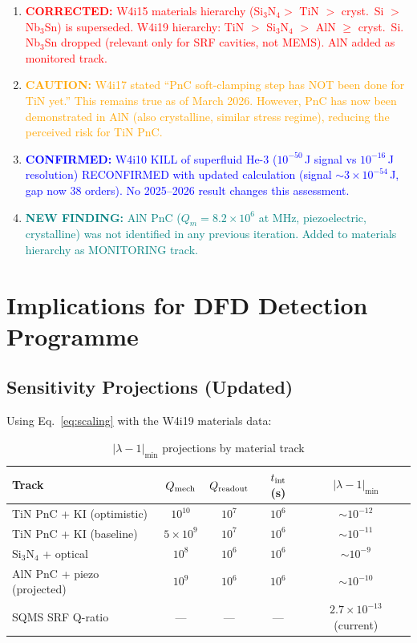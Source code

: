 \documentclass[11pt]{article}
\theoremstyle{remark}
\newcommand{\ee}[1]{\times 10^{#1}}
\newcommand{\confirmed}[1]{\textcolor{blue}{\textbf{CONFIRMED:} #1}}
\newcommand{\corrected}[1]{\textcolor{red}{\textbf{CORRECTED:} #1}}
\newcommand{\caution}[1]{\textcolor{orange}{\textbf{CAUTION:} #1}}
\newcommand{\newfinding}[1]{\textcolor{teal}{\textbf{NEW FINDING:} #1}}
\begin{document}
\begin{enumerate}
  \item \corrected{W4i15 materials hierarchy (Si$_3$N$_4 > $ TiN $>$
    cryst.\ Si $>$ Nb$_3$Sn) is superseded. W4i19 hierarchy:
    TiN $>$ Si$_3$N$_4$ $>$ AlN $\geq$ cryst.\ Si. Nb$_3$Sn
    dropped (relevant only for SRF cavities, not MEMS). AlN added
    as monitored track.}

  \item \caution{W4i17 stated ``PnC soft-clamping step has NOT been
    done for TiN yet.'' This remains true as of March 2026. However,
    PnC has now been demonstrated in AlN (also crystalline, similar
    stress regime), reducing the perceived risk for TiN PnC.}

  \item \confirmed{W4i10 KILL of superfluid He-3 ($10^{-50}$\,J signal
    vs $10^{-16}$\,J resolution) RECONFIRMED with updated calculation
    (signal $\sim 3\ee{-54}$\,J, gap now 38 orders). No 2025--2026
    result changes this assessment.}

  \item \newfinding{AlN PnC ($Q_m = 8.2\ee{6}$ at MHz, piezoelectric,
    crystalline) was not identified in any previous iteration. Added
    to materials hierarchy as MONITORING track.}
\end{enumerate}


\section{Implications for DFD Detection Programme}
\label{sec:implications}

\subsection{Sensitivity Projections (Updated)}

Using Eq.~\eqref{eq:scaling} with the W4i19 materials data:

\begin{table}[H]
\centering
\caption{$|\lambda - 1|_{\min}$ projections by material track}
\label{tab:sensitivity}
\begin{tabular}{@{}lcccc@{}}
\toprule
Track & $Q_{\rm mech}$ & $Q_{\rm readout}$ & $t_{\rm int}$ (s) &
  $|\lambda - 1|_{\min}$ \\
\midrule
TiN PnC + KI (optimistic) & $10^{10}$ & $10^7$ & $10^6$ &
  $\sim 10^{-12}$ \\
TiN PnC + KI (baseline) & $5\ee{9}$ & $10^7$ & $10^6$ &
  $\sim 10^{-11}$ \\
Si$_3$N$_4$ + optical & $10^8$ & $10^6$ & $10^6$ &
  $\sim 10^{-9}$ \\
AlN PnC + piezo (projected) & $10^9$ & $10^6$ & $10^6$ &
  $\sim 10^{-10}$ \\
SQMS SRF Q-ratio & --- & --- & --- &
  $2.7\ee{-13}$ (current) \\
\bottomrule
\end{tabular}
\end{table}
\end{document}
